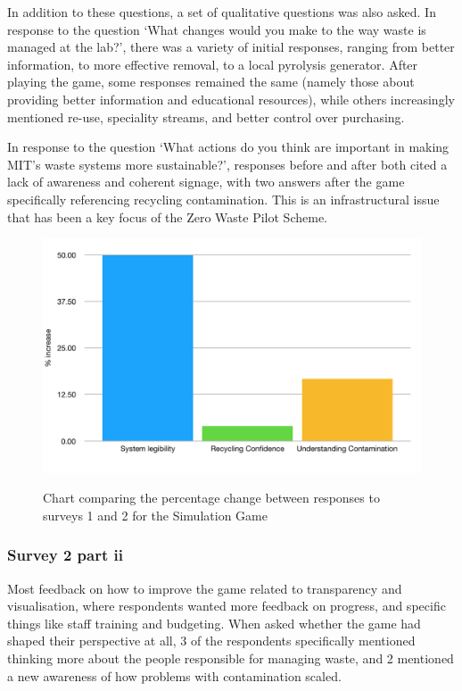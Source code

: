 \documentclass[nofonts,nols,justified,nobib]{tufte-book}
\begin{document}
In addition to these questions, a set of qualitative questions was also asked. In response to the question `What changes would you make to the way waste is managed at the lab?', there was a variety of initial responses, ranging from better information, to more effective removal, to a local pyrolysis generator. After playing the game, some responses remained the same (namely those about providing better information and educational resources), while others increasingly mentioned re-use, speciality streams, and better control over purchasing.

In response to the question `What actions do you think are important in making MIT's waste systems more sustainable?', responses before and after both cited a lack of awareness and coherent signage, with two answers after the game specifically referencing recycling contamination. This is an infrastructural issue that has been a key focus of the Zero Waste Pilot Scheme.


\begin{figure}
  \caption{Chart comparing the percentage change between responses to surveys 1 and 2 for the Simulation Game}
  \includegraphics[width=1\linewidth]{img/4/attitude-changes-sim.png}
  \label{contamination}
\end{figure}


\subsubsection*{Survey 2 part ii}
Most feedback on how to improve the game related to transparency and visualisation, where respondents wanted more feedback on progress, and specific things like staff training and budgeting. When asked whether the game had shaped their perspective at all, 3 of the respondents specifically mentioned thinking more about the people responsible for managing waste, and 2 mentioned a new awareness of how problems with contamination scaled.
\end{document}
